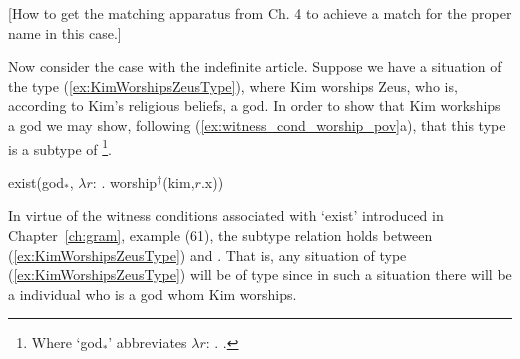  
 
   
    

[How to get the matching apparatus from Ch. 4 to achieve a match for
the proper name in this case.] 

Now consider the case with the indefinite article.  Suppose we have a
situation of the type (\ref{ex:KimWorshipsZeusType}), where Kim
worships Zeus, who is, according to Kim's religious beliefs, a god.
In order to show that Kim workships a god we may
show, following (\ref{ex:witness_cond_worship_pov}a), that this type
is a subtype of \nexteg{}\footnote{Where `god$_*$' abbreviates $\lambda
r$:
. .}.
\begin{ex} 
exist(god$_*$, $\lambda r$:
. worship$^\dagger$(kim,$r$.x)) 
\end{ex} 
In virtue of the witness conditions associated with `exist'
introduced in Chapter~\ref{ch:gram}, example (61), the subtype relation
holds between (\ref{ex:KimWorshipsZeusType}) and \preveg{}.  That is,
any situation of type (\ref{ex:KimWorshipsZeusType}) will be of type
\preveg{} since in such a situation there will be a individual who is
a god whom Kim worships.


